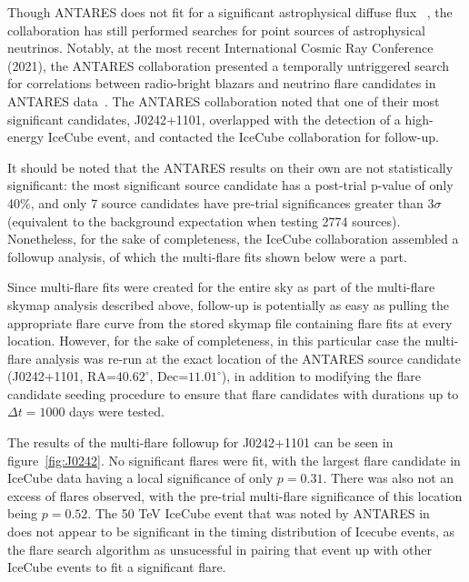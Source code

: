 Though ANTARES does not fit for a significant astrophysical diffuse flux ~\cite{Albert_2018}, the collaboration has still performed searches for point sources of astrophysical neutrinos. Notably, at the most recent International Cosmic Ray Conference (2021)\footnotemark, the ANTARES collaboration presented a temporally untriggered search for correlations between radio-bright blazars and neutrino flare candidates in ANTARES data~\cite{Illuminati:202198}. The ANTARES collaboration noted that one of their most significant candidates, J0242+1101, overlapped with the detection of a high-energy IceCube event, and contacted the IceCube collaboration for follow-up.

It should be noted that the ANTARES results on their own are not statistically significant: the most significant source candidate has a post-trial p-value of only 40\%, and only 7 source candidates have pre-trial significances greater than $3\sigma$ (equivalent to the background expectation when testing 2774 sources). Nonetheless, for the sake of completeness, the IceCube collaboration assembled a followup analysis, of which the multi-flare fits shown below were a part. 

Since multi-flare fits were created for the entire sky as part of the multi-flare skymap analysis described above, follow-up is potentially as easy as pulling the appropriate flare curve from the stored skymap file containing flare fits at every location. However, for the sake of completeness, in this particular case the multi-flare analysis was re-run at the exact location of the ANTARES source candidate (J0242+1101, RA=$40.62^{\circ}$, Dec=$11.01^{\circ}$), in addition to modifying the flare candidate seeding procedure to ensure that flare candidates with durations up to $\Delta t=1000$ days were tested.  

The results of the multi-flare followup for J0242+1101 can be seen in figure~\ref{fig:J0242}. No significant flares were fit, with the largest flare candidate in IceCube data having a local significance of only $p=0.31$. There was also not an excess of flares observed, with the pre-trial multi-flare significance of this location being $p=0.52$. The 50 TeV IceCube event that was noted by ANTARES in ~\cite{Illuminati:202198} does not appear to be significant in the timing distribution of Icecube events, as the flare search algorithm as unsucessful in pairing that event up with other IceCube events to fit a significant flare. 


